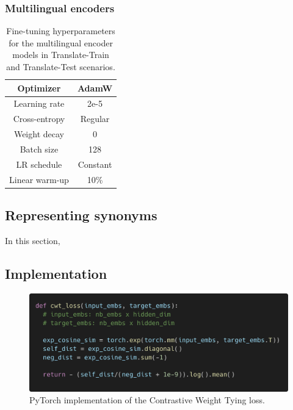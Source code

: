 \subsubsection{Multilingual encoders}
\label{app:ft_multi_enc}
\begin{table}[H]
\centering \small
\begin{tabular}{c|c}
\toprule
Optimizer        &   AdamW         \\ \hline
Learning rate        &   2e-5         \\ \hline
Cross-entropy  &  Regular    \\ \hline
Weight decay  &     0      \\ \hline
Batch size & 128 \\ \hline
LR schedule & Constant \\ \hline
Linear warm-up & 10\% \\ \bottomrule
\end{tabular}
\caption{Fine-tuning hyperparameters for the multilingual encoder models in Translate-Train and Translate-Test scenarios.}
\label{tab:ft_multi_enc}
\end{table}

\subsection{Representing synonyms}
\label{app:cosine_input_embs}

In this section, 



\subsection{Implementation}

\begin{figure}[h]
    \centering
    \includegraphics[width=\linewidth]{sources/part_2/headless/imgs/cwt_implementation.png}
    \caption{PyTorch implementation of the Contrastive Weight Tying loss.}
    \label{fig:cwt_implementation}
\end{figure}

